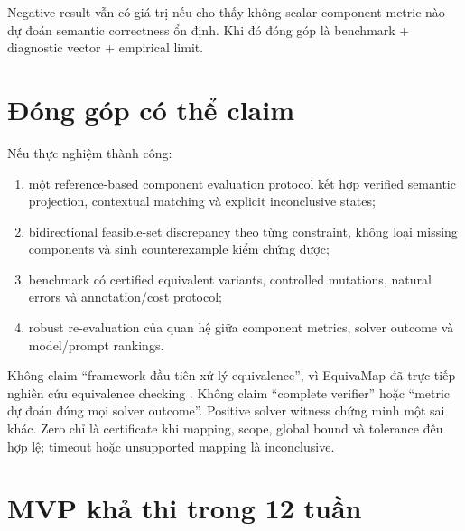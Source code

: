 \documentclass[11pt,a4paper]{article}
\begin{document}
Negative result vẫn có giá trị nếu cho thấy không scalar component metric nào dự
đoán semantic correctness ổn định. Khi đó đóng góp là benchmark + diagnostic
vector + empirical limit.

\section{Đóng góp có thể claim}

Nếu thực nghiệm thành công:

\begin{enumerate}
  \item một reference-based component evaluation protocol kết hợp verified
  semantic projection, contextual matching và explicit inconclusive states;
  \item bidirectional feasible-set discrepancy theo từng constraint, không loại
  missing components và sinh counterexample kiểm chứng được;
  \item benchmark có certified equivalent variants, controlled mutations,
  natural errors và annotation/cost protocol;
  \item robust re-evaluation của quan hệ giữa component metrics, solver outcome
  và model/prompt rankings.
\end{enumerate}

\begin{warningbox}
Không claim ``framework đầu tiên xử lý equivalence'', vì EquivaMap đã trực tiếp
nghiên cứu equivalence checking \parencite{zhai2025equivamap}. Không claim
``complete verifier'' hoặc ``metric dự đoán đúng mọi solver outcome''. Positive
solver witness chứng minh một sai khác. Zero chỉ là certificate khi mapping,
scope, global bound và tolerance đều hợp lệ; timeout hoặc unsupported mapping
là inconclusive.
\end{warningbox}

\section{MVP khả thi trong 12 tuần}
\end{document}
